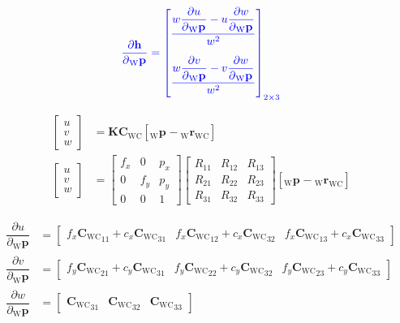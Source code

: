 \documentclass{report}
\renewcommand{\Vec}[1]{{\mathbf{#1}}}
\newcommand{\Mat}[1]{{\mathbf{#1}}}
\newcommand{\cam}{{\text{C}}}
\newcommand{\world}{{\text{W}}}
\newcommand{\KineNotationTransform}[3]{{{#1}_{#2#3}}}
\newcommand{\KineNotation}[3]{{{{}_{#2}} {#1}_{#2#3}}}
\newcommand{\KineNotationPart}[3]{{{{}_{#2}} {#1}_{#3}}}
\newcommand{\pos}{{\Vec{r}}}
\newcommand{\Pos}[2]{{\KineNotation{\pos}{#1}{#2}}}
\newcommand{\rot}{{\Mat{C}}}
\newcommand{\Rot}[2]{{\KineNotationTransform{\rot}{#1}{#2}}}
\newcommand{\point}{\Vec{p}}
\newcommand{\Pt}[1]{{\KineNotationPart{\point}{#1}{}}}
\newcommand{\camRot}{{\Rot{\world}{\cam}}}
\newcommand{\camPos}{{\Pos{\world}{\cam}}}
\newcommand{\projFunc}{{\Vec{h}}}
\begin{document}
\begin{align}
  \color{blue}
  \dfrac{\partial{\projFunc}}{\partial{\Pt{\world}}} =
  \begin{bmatrix}
    \dfrac{
      w \dfrac{\partial{u}}{\partial{\Pt{\world}}} -
      u \dfrac{\partial{w}}{\partial{\Pt{\world}}}
    }{w^{2}} \vspace{1.0em} \\
    \dfrac{
      w \dfrac{\partial{v}}{\partial{\Pt{\world}}} -
      v \dfrac{\partial{w}}{\partial{\Pt{\world}}}
    }{w^{2}} \vspace{0.5em}
  \end{bmatrix}_{2 \times 3}
\end{align}

\begin{align}
  \begin{bmatrix} u \\ v \\ w \end{bmatrix}
    &= \Mat{K} \camRot [\Pt{\world} - \camPos]
    \nonumber \\
  \begin{bmatrix} u \\ v \\ w \end{bmatrix}
  &= \begin{bmatrix}
      f_x & 0 & p_x \\
      0 & f_y & p_y \\
      0 & 0 & 1
  \end{bmatrix}
  \begin{bmatrix}
      R_{11} & R_{12} & R_{13} \\
      R_{21} & R_{22} & R_{23} \\
      R_{31} & R_{32} & R_{33}
  \end{bmatrix}
  [\Pt{\world} - \camPos]
  \nonumber
\end{align}

\begin{align}
  \dfrac{\partial{u}}{\partial{\Pt{\world}}} &=
    \begin{bmatrix}
      f_{x} \camRot_{11} + c_{x} \camRot_{31} &
      f_{x} \camRot_{12} + c_{x} \camRot_{32} &
      f_{x} \camRot_{13} + c_{x} \camRot_{33}
    \end{bmatrix} \\
  \dfrac{\partial{v}}{\partial{\Pt{\world}}} &=
    \begin{bmatrix}
      f_{y} \camRot_{21} + c_{y} \camRot_{31} &
      f_{y} \camRot_{22} + c_{y} \camRot_{32} &
      f_{y} \camRot_{23} + c_{y} \camRot_{33}
    \end{bmatrix} \\
  \dfrac{\partial{w}}{\partial{\Pt{\world}}} &=
    \begin{bmatrix}
      \camRot_{31} &
      \camRot_{32} &
      \camRot_{33}
    \end{bmatrix}
\end{align}
\end{document}
